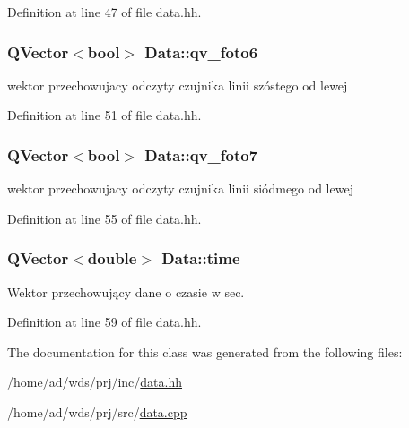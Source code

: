 Definition at line 47 of file data.\+hh.

\subsubsection[{\texorpdfstring{qv\+\_\+foto6}{qv_foto6}}]{\setlength{\rightskip}{0pt plus 5cm}Q\+Vector$<$bool$>$ Data\+::qv\+\_\+foto6\hspace{0.3cm}{\ttfamily [private]}}\hypertarget{class_data_a183992c23a4a5a4e2915da0345543a90}{}\label{class_data_a183992c23a4a5a4e2915da0345543a90}


wektor przechowujacy odczyty czujnika linii szóstego od lewej 



Definition at line 51 of file data.\+hh.

\subsubsection[{\texorpdfstring{qv\+\_\+foto7}{qv_foto7}}]{\setlength{\rightskip}{0pt plus 5cm}Q\+Vector$<$bool$>$ Data\+::qv\+\_\+foto7\hspace{0.3cm}{\ttfamily [private]}}\hypertarget{class_data_a9bf854a571f4670b99b4373fa9d239aa}{}\label{class_data_a9bf854a571f4670b99b4373fa9d239aa}


wektor przechowujacy odczyty czujnika linii siódmego od lewej 



Definition at line 55 of file data.\+hh.

\subsubsection[{\texorpdfstring{time}{time}}]{\setlength{\rightskip}{0pt plus 5cm}Q\+Vector$<$double$>$ Data\+::time\hspace{0.3cm}{\ttfamily [private]}}\hypertarget{class_data_a52868c99e04a5ed6b61b2af204d39201}{}\label{class_data_a52868c99e04a5ed6b61b2af204d39201}


Wektor przechowujący dane o czasie w sec. 



Definition at line 59 of file data.\+hh.



The documentation for this class was generated from the following files\+:\begin{DoxyCompactItemize}
\item 
/home/ad/wds/prj/inc/\hyperlink{data_8hh}{data.\+hh}\item 
/home/ad/wds/prj/src/\hyperlink{data_8cpp}{data.\+cpp}\end{DoxyCompactItemize}
